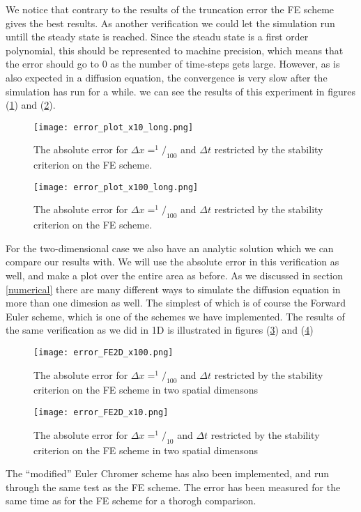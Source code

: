 \documentclass[a4paper,english, 10pt, twoside]{article}
\begin{document}
We notice that contrary to the results of the truncation error the FE scheme gives the best results. As another verification we could let the 
simulation run untill the steady state is reached. Since the steadu state is a first order polynomial, this should be represented to machine precision, 
which means that the error should go to 0 as the number of time-steps gets large. However, as is also expected in a diffusion equation, the 
convergence is very slow after the simulation has run for a while. we can see the results of this experiment in figures (\ref{errors_nx10_long}) and 
(\ref{errors_nx100_long}).
\begin{figure}[H]
 \centering
 \texttt{[image: error\_plot\_x10\_long.png]}
 \caption{The absolute error for $\Delta x = ^1/_{100}$ and $\Delta t$ restricted by the stability criterion on the FE scheme. }
 \label{errors_nx10_long}
\end{figure}
\begin{figure}[H]
 \centering
 \texttt{[image: error\_plot\_x100\_long.png]}
 \caption{The absolute error for $\Delta x = ^1/_{100}$ and $\Delta t$ restricted by the stability criterion on the FE scheme.}
 \label{errors_nx100_long}
\end{figure}
For the two-dimensional case we also have an analytic solution which we can compare our results with. We will use the absolute error in this 
verification as well, and make a plot over the entire area as before. As we discussed in section \ref{numerical} there are many different ways 
to simulate the diffusion equation in more than one dimesion as well. The simplest of which is of course the Forward Euler scheme, which is one of 
the schemes we have implemented. The results of the same verification as we did in 1D is illustrated in figures (\ref{errors_FE2D_nx100}) and 
(\ref{errors_FE2D_nx10})
\begin{figure}[H]
 \centering
 \texttt{[image: error\_FE2D\_x100.png]}
 \caption{The absolute error for $\Delta x = ^1/_{100}$ and $\Delta t$ restricted by the stability criterion on the FE scheme in two spatial dimensons }
 \label{errors_FE2D_nx100}
\end{figure}
\begin{figure}[H]
 \centering
 \texttt{[image: error\_FE2D\_x10.png]}
 \caption{The absolute error for $\Delta x = ^1/_{10}$ and $\Delta t$ restricted by the stability criterion on the FE scheme in two spatial dimensons }
 \label{errors_FE2D_nx10}
\end{figure}
The ``modified'' Euler Chromer scheme has also been implemented, and run through the same test as the FE scheme. The error has been measured for 
the same time as for the FE scheme for a thorogh comparison. 
\end{document}
